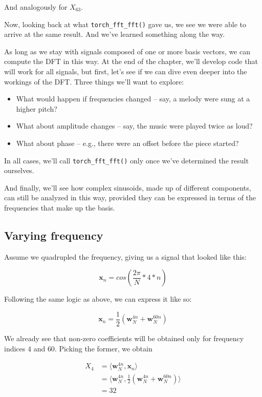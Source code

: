 \documentclass[
  letterpaper,
]{krantz}
\begin{document}
And analogously for \(X_{63}\).

Now, looking back at what \texttt{torch\_fft\_fft()} gave us, we see we
were able to arrive at the same result. And we've learned something
along the way.

As long as we stay with signals composed of one or more basis vectors,
we can compute the DFT in this way. At the end of the chapter, we'll
develop code that will work for all signals, but first, let's see if we
can dive even deeper into the workings of the DFT. Three things we'll
want to explore:

\begin{itemize}
\item
  What would happen if frequencies changed -- say, a melody were sung at
  a higher pitch?
\item
  What about amplitude changes -- say, the music were played twice as
  loud?
\item
  What about phase -- e.g., there were an offset before the piece
  started?
\end{itemize}

In all cases, we'll call \texttt{torch\_fft\_fft()} only once we've
determined the result ourselves.

And finally, we'll see how complex sinusoids, made up of different
components, can still be analyzed in this way, provided they can be
expressed in terms of the frequencies that make up the basis.

\hypertarget{varying-frequency}{%
\subsection{\texorpdfstring{Varying
frequency}{Varying frequency}}\label{varying-frequency}}

Assume we quadrupled the frequency, giving us a signal that looked like
this:

\[
\mathbf{x}_n = cos(\frac{2 \pi}{N}*4*n)
\]

Following the same logic as above, we can express it like so:

\[
\mathbf{x}_n = \frac{1}{2} (\mathbf{w}^{4n}_N + \mathbf{w}^{60n}_N)
\]

We already see that non-zero coefficients will be obtained only for
frequency indices \(4\) and \(60\). Picking the former, we obtain

\[
\begin{aligned}
X_4 &= \langle \mathbf{w}^{4n}_N, \mathbf{x}_n \rangle \\
&= \langle \mathbf{w}^{4n}_N, \frac{1}{2} (\mathbf{w}^{4n}_N + \mathbf{w}^{60n}_N) \rangle \\
&= 32
\end{aligned}
\]
\end{document}
